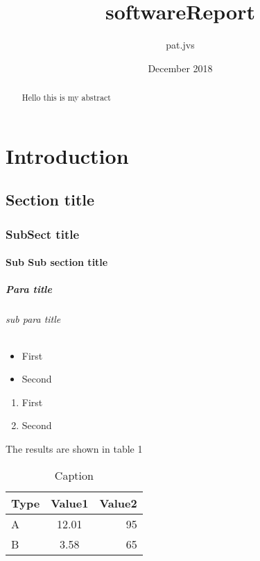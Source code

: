 \documentclass{report}
\title{softwareReport}
\author{pat.jvs }
\date{December 2018}
\begin{document}
\maketitle

\tableofcontents

\begin{abstract}
    Hello this is my abstract
\end{abstract}

\chapter{Introduction}
\section{Section title}
\subsection{SubSect title}
\subsubsection{Sub Sub section title}
\paragraph{Para title}
\subparagraph{sub para title}

\begin{itemize}
    \item First
    \item Second
\end{itemize}

\begin{enumerate}
    \item First
    \item Second
\end{enumerate}

The results are shown in table 1
\begin{table}[]
    \centering
    \begin{tabular}{l c r}
        \toprule
        Type    & Value1 & Value2   \\
        \midrule
        A       & 12.01 & 95        \\
        B       & 3.58  & 65        \\
        \bottomrule
    \end{tabular}
    \caption{Caption}
    \label{tab:my_label}
\end{table}
\end{document}
